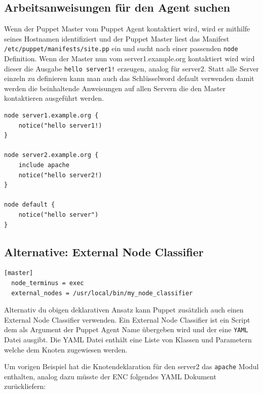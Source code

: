 \documentclass[12pt,a4paper,ngerman]{article}
\begin{document}

\subsection{Arbeitsanweisungen für den Agent suchen}

Wenn der Puppet Master vom Puppet Agent kontaktiert wird, wird er mithilfe seines Hostnamen identifiziert und der Puppet Master liest das Manifest \lstinline$/etc/puppet/manifests/site.pp$ ein und sucht nach einer passenden \lstinline$node$ Definition. Wenn der Master nun vom server1.example.org kontaktiert wird wird dieser die Ausgabe \lstinline$hello server1!$ erzeugen, analog für server2. Statt alle Server einzeln zu definieren kann man auch das Schlüsselword default verwenden damit werden die beinhaltende Anweisungen auf allen Servern die den Master kontaktieren ausgeführt werden. 

\begin{lstlisting}[language=puppet,caption=Node Definitionen in /etc/puppet/manifests/site.pp, label=puppet-node-classifier]
node server1.example.org {
    notice("hello server1!)
}

node server2.example.org {
    include apache
    notice("hello server2!)
}

node default {
    notice("hello server")
}

\end{lstlisting}  

\subsection{Alternative: External Node Classifier}
     
\begin{lstlisting}[caption=External Node Classifier Konfiguration des Puppet Master, label=puppet-enc-config]
[master]
  node_terminus = exec
  external_nodes = /usr/local/bin/my_node_classifier
\end{lstlisting} 

Alternativ du obigen deklarativen Ansatz kann Puppet zusätzlich auch einen External Node Classifier verwenden.  Ein External Node Classifier ist ein Script dem als Argument der Puppet Agent Name übergeben wird und der eine \lstinline$YAML$ Datei ausgibt. Die YAML Datei enthält eine Liste von Klassen und Parametern welche dem Knoten zugewiesen werden.  

Um vorigen Beispiel hat die Knotendeklaration für den server2 das \lstinline$apache$ Modul enthalten, analog dazu müsste der ENC folgendes YAML Dokument zurückliefern:  
\end{document}
